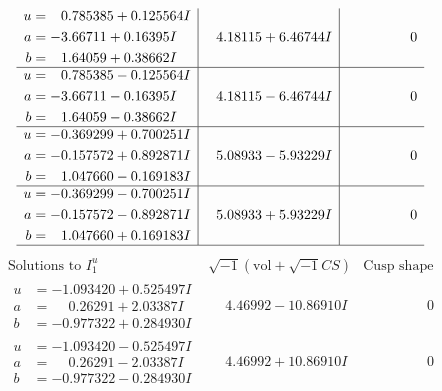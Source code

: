 \documentclass[1p]{elsarticle_modified}
\theoremstyle{definition}
\newcommand{\I}{\sqrt{-1}}
\begin{document}
$$\begin{array}{c|c|c}
\begin{aligned}
u &= \phantom{-}0.785385 + 0.125564 I \\
a &= -3.66711 + 0.16395 I \\
b &= \phantom{-}1.64059 + 0.38662 I\end{aligned}
 & \phantom{-}4.18115 + 6.46744 I & \phantom{-0.000000 } 0 \\ \hline\begin{aligned}
u &= \phantom{-}0.785385 - 0.125564 I \\
a &= -3.66711 - 0.16395 I \\
b &= \phantom{-}1.64059 - 0.38662 I\end{aligned}
 & \phantom{-}4.18115 - 6.46744 I & \phantom{-0.000000 } 0 \\ \hline\begin{aligned}
u &= -0.369299 + 0.700251 I \\
a &= -0.157572 + 0.892871 I \\
b &= \phantom{-}1.047660 - 0.169183 I\end{aligned}
 & \phantom{-}5.08933 - 5.93229 I & \phantom{-0.000000 } 0 \\ \hline\begin{aligned}
u &= -0.369299 - 0.700251 I \\
a &= -0.157572 - 0.892871 I \\
b &= \phantom{-}1.047660 + 0.169183 I\end{aligned}
 & \phantom{-}5.08933 + 5.93229 I & \phantom{-0.000000 } 0\\
 \hline 
 \end{array}$$\newpage$$\begin{array}{c|c|c}  
\text{Solutions to }I^u_{1}& \I (\text{vol} + \sqrt{-1}CS) & \text{Cusp shape}\\
 \hline 
\begin{aligned}
u &= -1.093420 + 0.525497 I \\
a &= \phantom{-}0.26291 + 2.03387 I \\
b &= -0.977322 + 0.284930 I\end{aligned}
 & \phantom{-}4.46992 - 10.86910 I & \phantom{-0.000000 } 0 \\ \hline\begin{aligned}
u &= -1.093420 - 0.525497 I \\
a &= \phantom{-}0.26291 - 2.03387 I \\
b &= -0.977322 - 0.284930 I\end{aligned}
 & \phantom{-}4.46992 + 10.86910 I & \phantom{-0.000000 } 0 \\ \hline\begin{aligned}

\end{aligned}
\end{array}$$
\end{document}
